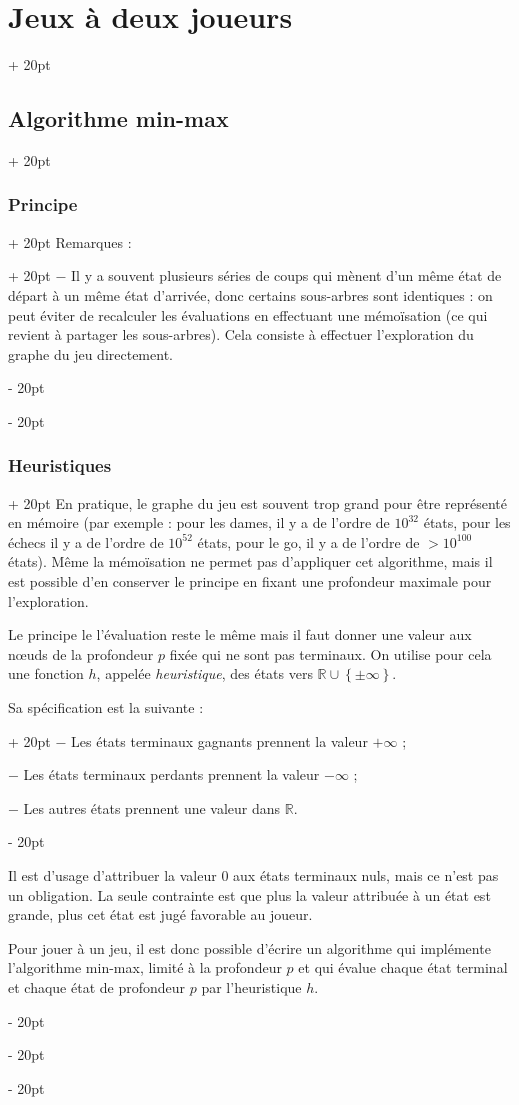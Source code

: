 \documentclass[a4paper, 12pt, twoside]{article}
\newcommand{\R}{\mathbb{R}} %
\newcommand{\set}[1]{\left\{ #1 \right\}}
\newcommand{\ind}[1][20pt]{\advance\leftskip + #1}
\newcommand{\deind}[1][20pt]{\advance\leftskip - #1}
\newenvironment{indt}[2][20pt]{#2 \par \ind[#1]}{\par \deind} %
\begin{document}
\begin{indt}{\section{Jeux à deux joueurs}}
\begin{indt}{\subsection{Algorithme min-max}}
\begin{indt}{\subsubsection{Principe}}
\begin{indt}{Remarques :}
                    $-$ Il y a souvent plusieurs séries de coups qui mènent d'un même état de départ à un même état d'arrivée, donc certains sous-arbres sont identiques : on peut éviter de recalculer les évaluations en effectuant une mémoïsation (ce qui revient à partager les sous-arbres). Cela consiste à effectuer l'exploration du graphe du jeu directement.
                \end{indt}
            \end{indt}

            \vspace{12pt}
            
            \begin{indt}{\subsubsection{Heuristiques}}
                En pratique, le graphe du jeu est souvent trop grand pour être représenté en mémoire (par exemple : pour les dames, il y a de l'ordre de $10^{32}$ états, pour les échecs il y a de l'ordre de $10^{52}$ états, pour le go, il y a de l'ordre de $> 10^{100}$ états).
                Même la mémoïsation ne permet pas d'appliquer cet algorithme, mais il est possible d'en conserver le principe en fixant une profondeur maximale pour l'exploration.

                Le principe le l'évaluation reste le même mais il faut donner une valeur aux n\oe uds de la profondeur $p$ fixée qui ne sont pas terminaux. On utilise pour cela une fonction $h$, appelée \emph{heuristique}, des états vers $\R \cup \set{\pm \infty}$.

                \begin{indt}{Sa spécification est la suivante :}
                    $-$ Les états terminaux gagnants prennent la valeur $+\infty$ ;

                    $-$ Les états terminaux perdants prennent la valeur $-\infty$ ;

                    $-$ Les autres états prennent une valeur dans $\R$.
                \end{indt}

                Il est d'usage d'attribuer la valeur $0$ aux états terminaux nuls, mais ce n'est pas un obligation.
                La seule contrainte est que plus la valeur attribuée à un état est grande, plus cet état est jugé favorable au joueur.

                Pour jouer à un jeu, il est donc possible d'écrire un algorithme qui implémente l'algorithme min-max, limité à la profondeur $p$ et qui évalue chaque état terminal et chaque état de profondeur $p$ par l'heuristique $h$.


\end{indt}
\end{indt}
\end{indt}
\end{document}
